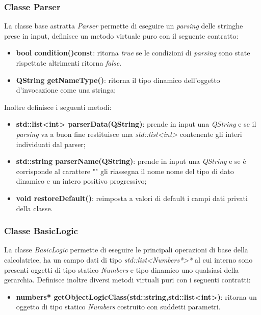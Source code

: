 \documentclass[a4paper,10pt]{article}
\begin{document}
            \subsubsection{Classe Parser}
            La classe base astratta \textit{Parser} permette di eseguire un \textit{parsing} delle stringhe prese in input, definisce un metodo virtuale puro con il seguente contratto:
            \begin{itemize}
                \item \textbf{bool condition()const}: ritorna \textit{true} se le condizioni di \textit{parsing} sono state rispettate altrimenti ritorna \textit{false}.
                \item \textbf{QString getNameType()}: ritorna il tipo dinamico dell'oggetto d'invocazione come una stringa;
            \end{itemize}
            Inoltre definisce i seguenti metodi:
            \begin{itemize}
                \item \textbf{std::list<int> parserData(QString)}: prende in input una \textit{QString} e se il \textit{parsing} va a buon fine restituisce una \textit{std::list<int>} contenente gli interi individuati dal parser;
                \item \textbf{std::string parserName(QString)}: prende in input una \textit{QString} e se è corrisponde al carattere "" gli riassegna il nome nome del tipo di dato dinamico e un intero positivo progressivo;
                \item \textbf{void restoreDefault()}: reimposta a valori di default i campi dati privati della classe.
            \end{itemize}
            
            \subsubsection{Classe BasicLogic}
            La classe \textit{BasicLogic} permette di eseguire le principali operazioni di base della calcolatrice, ha un campo dati di tipo \textit{std::list<Numbers*>*} al cui interno sono presenti oggetti di tipo statico \textit{Numbers} e tipo dinamico uno qualsiasi della gerarchia.
            Definisce inoltre diversi metodi virtuali puri con i seguenti contratti:
            \begin{itemize}
                \item \textbf{numbers* getObjectLogicClass(std::string,std::list<int>)}: ritorna un oggetto di tipo statico \textit{Numbers} costruito con suddetti parametri.
            \end{itemize}
    
\end{document}
